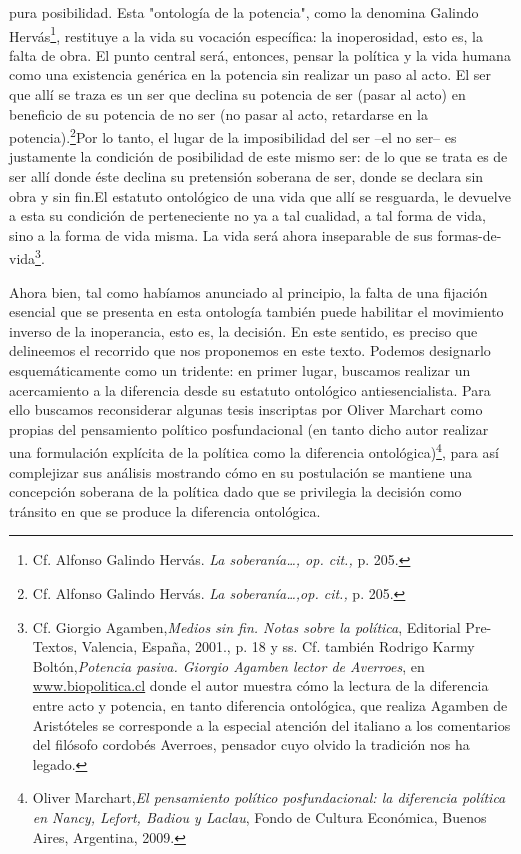\documentclass{book}
\begin{document}
pura posibilidad. Esta "ontología de la potencia", como la denomina
Galindo Hervás\footnote{Cf. Alfonso Galindo Hervás. \emph{La
  soberanía\ldots, op. cit.,} p. 205.}, restituye a la vida su vocación
específica: la inoperosidad, esto es, la falta de obra. El punto central
será, entonces, pensar la política y la vida humana como una existencia
genérica en la potencia sin realizar un paso al acto. El ser que allí se
traza es un ser que declina su potencia de ser (pasar al acto) en
beneficio de su potencia de no ser (no pasar al acto, retardarse en la
potencia).\footnote{Cf. Alfonso Galindo Hervás. \emph{La
  soberanía\ldots,op. cit.,} p. 205.}Por lo tanto, el lugar de la
imposibilidad del ser --el no ser-- es justamente la condición de
posibilidad de este mismo ser: de lo que se trata es de ser allí donde
éste declina su pretensión soberana de ser, donde se declara sin obra y
sin fin.El estatuto ontológico de una vida que allí se resguarda, le
devuelve a esta su condición de perteneciente no ya a tal cualidad, a
tal forma de vida, sino a la forma de vida misma. La vida será ahora
inseparable de sus formas-de-vida\footnote{Cf. Giorgio
  Agamben,\emph{Medios sin fin. Notas sobre la política}, Editorial
  Pre-Textos, Valencia, España, 2001., p. 18 y ss. Cf. también Rodrigo
  Karmy Boltón,\emph{Potencia pasiva. Giorgio Agamben lector de
  Averroes}, en \href{http://www.biopolitica.cl/}{www.biopolitica.cl}
  donde el autor muestra cómo la lectura de la diferencia entre acto y
  potencia, en tanto diferencia ontológica, que realiza Agamben de
  Aristóteles se corresponde a la especial atención del italiano a los
  comentarios del filósofo cordobés Averroes, pensador cuyo olvido la
  tradición nos ha legado.}.

Ahora bien, tal como habíamos anunciado al principio, la falta de una
fijación esencial que se presenta en esta ontología también puede
habilitar el movimiento inverso de la inoperancia, esto es, la decisión.
En este sentido, es preciso que delineemos el recorrido que nos
proponemos en este texto. Podemos designarlo esquemáticamente como un
tridente: en primer lugar, buscamos realizar un acercamiento a la
diferencia desde su estatuto ontológico antiesencialista. Para ello
buscamos reconsiderar algunas tesis inscriptas por Oliver Marchart como
propias del pensamiento político posfundacional (en tanto dicho autor
realizar una formulación explícita de la política como la diferencia
ontológica)\footnote{Oliver Marchart,\emph{El pensamiento político
  posfundacional: la diferencia política en Nancy, Lefort, Badiou y
  Laclau}, Fondo de Cultura Económica, Buenos Aires, Argentina, 2009.},
para así complejizar sus análisis mostrando cómo en su postulación se
mantiene una concepción soberana de la política dado que se privilegia
la decisión como tránsito en que se produce la diferencia ontológica.
\end{document}
